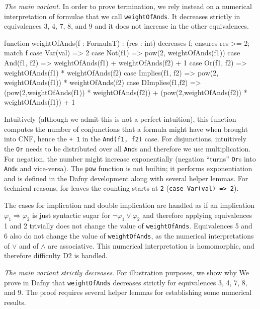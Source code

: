 \emph{The main variant}. In order to prove termination, we rely
instead on a numerical interpretation of formulae that we call
\texttt{weightOfAnds}. It decreases strictly in equivalences 3, 4, 7,
8, and 9 and it does not increase in the other equivalences.

\begin{dafny}
function weightOfAnds(f : FormulaT) : (res : int)
  decreases f; ensures res >= 2;
{ match f {
    case Var(val)        => 2
    case Not(f1)         => pow(2, weightOfAnds(f1))
    case And(f1, f2)     => weightOfAnds(f1) + weightOfAnds(f2) + 1
    case Or(f1, f2)      => weightOfAnds(f1) * weightOfAnds(f2)
    case Implies(f1, f2) => pow(2, weightOfAnds(f1)) * weightOfAnds(f2)
    case DImplies(f1,f2) => (pow(2,weightOfAnds(f1)) * weightOfAnds(f2)) +
                    (pow(2,weightOfAnds(f2)) * weightOfAnds(f1)) + 1 } }
\end{dafny}

Intuitively (although we admit this is not a perfect intuition), this
function computes the number of conjunctions that a formula might have
when brought into CNF, hence the \texttt{+ 1} in the \texttt{And(f1,
  f2)} case. For disjunctions, intuitively the \texttt{Or} needs to be
distributed over all \texttt{And}s and therefore we use
multiplication. For negation, the number might increase exponentially
(negation ``turns'' \texttt{Or}s into \texttt{And}s and
vice-versa). The \texttt{pow} function is not builtin; it performs
exponentiation and is defined in the Dafny development along with
several helper lemmas.  For technical reasons, for leaves the counting
starts at \texttt{2} (\texttt{case Var(val) => 2}).

The cases for implication and double implication are handled as if an
implication \( \varphi_1 \Rightarrow \varphi_2 \) is just syntactic
sugar for \( \lnot \varphi_1 \lor \varphi_2 \) and therefore applying
equivalences 1 and 2 trivially does not change the value of
\texttt{weightOfAnds}. Equivalences 5 and 6 also do not change the
value of \texttt{weightOfAnds}, as the numerical interpretations of
\( \lor \) and of \( \land \) are associative. This numerical
interpretation is homomorphic, and therefore difficulty D2 is handled.


\emph{The main variant strictly decreases}. For illustration purposes,
we show why
We prove in Dafny that \texttt{weightOfAnds} decreases strictly for
equivalences 3, 4, 7, 8, and 9. The proof requires several helper
lemmas for establishing some numerical results.


